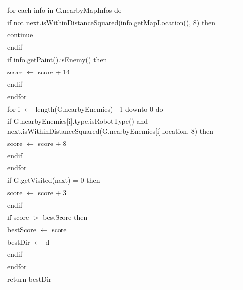 \documentclass{article}
\newenvironment{pseudobox}
{
\centering
\begin{longtable}{|p{0.94\linewidth}|}
\hline
}
{
\\ \hline
\end{longtable}
\vspace{0.05cm}
}
\begin{document}
\begin{pseudobox}
\hspace*{2em} for each info in G.nearbyMapInfos do \\
\hspace*{3em} if not next.isWithinDistanceSquared(info.getMapLocation(), 8) then \\
\hspace*{4em} continue \\
\hspace*{3em} endif \\
\hspace*{3em} if info.getPaint().isEnemy() then \\
\hspace*{4em} score $\leftarrow$ score + 14 \\
\hspace*{3em} endif \\
\hspace*{2em} endfor \\

\hspace*{2em} for i $\leftarrow$ length(G.nearbyEnemies) - 1 downto 0 do \\
\hspace*{3em} if G.nearbyEnemies[i].type.isRobotType() and next.isWithinDistanceSquared(G.nearbyEnemies[i].location, 8) then \\
\hspace*{4em} score $\leftarrow$ score + 8 \\
\hspace*{3em} endif \\
\hspace*{2em} endfor \\

\hspace*{2em} if G.getVisited(next) = 0 then \\
\hspace*{3em} score $\leftarrow$ score + 3 \\
\hspace*{2em} endif \\

\hspace*{2em} if score $>$ bestScore then \\
\hspace*{3em} bestScore $\leftarrow$ score \\
\hspace*{3em} bestDir $\leftarrow$ d \\
\hspace*{2em} endif \\
\hspace*{1em} endfor \\

\hspace*{1em} return bestDir
\end{pseudobox}
\end{document}
